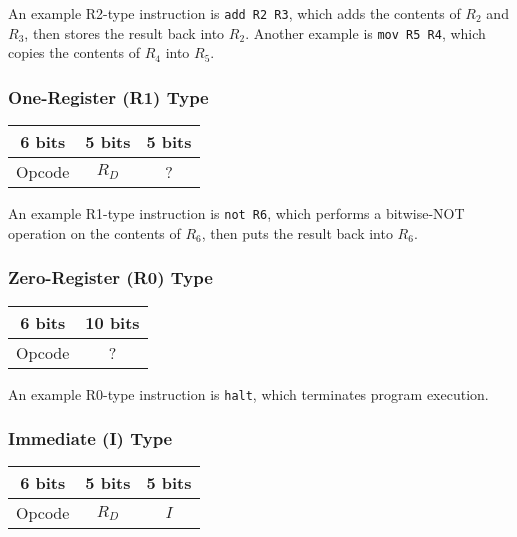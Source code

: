 \documentclass[12pt]{scrartcl}
\begin{document}
An example R2-type instruction is \texttt{add R2 R3}, which adds the contents of $R_2$ and $R_3$, then stores the result back into $R_2$. Another example is \texttt{mov R5 R4}, which copies the contents of $R_4$ into $R_5$.


\subsubsection{One-Register (R1) Type}

\begin{center}
  \begin{tabular}{|c|c|c|}
    \hline
    \textbf{6 bits} & \textbf{5 bits} & \textbf{5 bits} \\
    \hline
    Opcode & $R_D$ & ? \\
    \hline
  \end{tabular}
\end{center}

An example R1-type instruction is \texttt{not R6}, which performs a bitwise-NOT operation on the contents of $R_6$, then puts the result back into $R_6$.


\subsubsection{Zero-Register (R0) Type}

\begin{center}
  \begin{tabular}{|c|c|}
    \hline
    \textbf{6 bits} & \textbf{10 bits} \\
    \hline
    Opcode & ? \\
    \hline
  \end{tabular}
\end{center}

An example R0-type instruction is \texttt{halt}, which terminates program execution.


\subsubsection{Immediate (I) Type}

\begin{center}
  \begin{tabular}{|c|c|c|}
    \hline
    \textbf{6 bits} & \textbf{5 bits} & \textbf{5 bits} \\
    \hline
    Opcode & $R_D$ & $I$ \\
    \hline
  \end{tabular}
\end{center}
\end{document}
